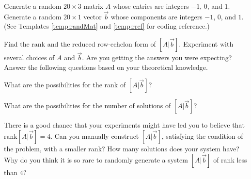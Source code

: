 \documentclass{ximera}
\begin{document}
\begin{problem}\label{prob_oct_sys_3}
    Generate a random $20\times 3$ matrix $A$ whose entries are integers $-1$, $0$, and $1$.  Generate a random $20\times 1$ vector $\vec{b}$ whose components are integers $-1$, $0$, and $1$.  (See Templates \ref{temp:randMat} and \ref{temp:rref} for coding reference.)

    Find the rank and the reduced row-echelon form of $[A | \vec{b}]$.  Experiment with several choices of $A$ and $\vec{b}$.  Are you getting the answers you were expecting?  Answer the following questions based on your theoretical knowledge.

    What are the possibilities for the rank of $[A | \vec{b}]$?  

    \begin{multipleChoice}
    \end{multipleChoice}

    What are the possibilities for the number of solutions of $[A | \vec{b}]$?

    \begin{multipleChoice}
    \end{multipleChoice}

    There is a good chance that your experiments might have led you to believe that $\text{rank}[A | \vec{b}]=4$.  Can you manually construct $[A | \vec{b}]$, satisfying the condition of the problem, with a smaller rank?  How many solutions does your system have?  Why do you think it is so rare to randomly generate a system $[A | \vec{b}]$ of rank less than $4$?
    
\end{problem}
\end{document}
